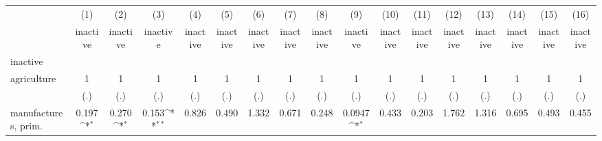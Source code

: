 {
\def\sym#1{\ifmmode^{#1}\else\(^{#1}\)\fi}
\begin{tabular}{l*{16}{c}}
\hline\hline
                    &\multicolumn{1}{c}{(1)}&\multicolumn{1}{c}{(2)}&\multicolumn{1}{c}{(3)}&\multicolumn{1}{c}{(4)}&\multicolumn{1}{c}{(5)}&\multicolumn{1}{c}{(6)}&\multicolumn{1}{c}{(7)}&\multicolumn{1}{c}{(8)}&\multicolumn{1}{c}{(9)}&\multicolumn{1}{c}{(10)}&\multicolumn{1}{c}{(11)}&\multicolumn{1}{c}{(12)}&\multicolumn{1}{c}{(13)}&\multicolumn{1}{c}{(14)}&\multicolumn{1}{c}{(15)}&\multicolumn{1}{c}{(16)}\\
                    &\multicolumn{1}{c}{inactive}&\multicolumn{1}{c}{inactive}&\multicolumn{1}{c}{inactive}&\multicolumn{1}{c}{inactive}&\multicolumn{1}{c}{inactive}&\multicolumn{1}{c}{inactive}&\multicolumn{1}{c}{inactive}&\multicolumn{1}{c}{inactive}&\multicolumn{1}{c}{inactive}&\multicolumn{1}{c}{inactive}&\multicolumn{1}{c}{inactive}&\multicolumn{1}{c}{inactive}&\multicolumn{1}{c}{inactive}&\multicolumn{1}{c}{inactive}&\multicolumn{1}{c}{inactive}&\multicolumn{1}{c}{inactive}\\
\hline
inactive            &                     &                     &                     &                     &                     &                     &                     &                     &                     &                     &                     &                     &                     &                     &                     &                     \\
agriculture         &           1         &           1         &           1         &           1         &           1         &           1         &           1         &           1         &           1         &           1         &           1         &           1         &           1         &           1         &           1         &           1         \\
                    &         (.)         &         (.)         &         (.)         &         (.)         &         (.)         &         (.)         &         (.)         &         (.)         &         (.)         &         (.)         &         (.)         &         (.)         &         (.)         &         (.)         &         (.)         &         (.)         \\
[1em]
manufactures, prim. &       0.197\sym{*}  &       0.270\sym{*}  &       0.153\sym{**} &       0.826         &       0.490         &       1.332         &       0.671         &       0.248         &      0.0947\sym{*}  &       0.433         &       0.203         &       1.762         &       1.316         &       0.695         &       0.493         &       0.455         \\

\end{tabular}}
